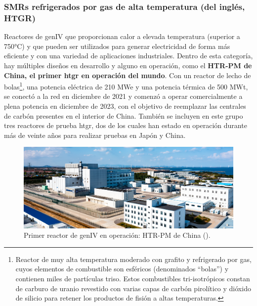 \subsubsection{SMRs refrigerados por gas de alta temperatura (del inglés, HTGR)}

Reactores de \acrshort{genIV} que proporcionan calor a elevada temperatura (superior a 750°C) y que pueden ser utilizados para generar electricidad de forma más eficiente y con una variedad de aplicaciones industriales. Dentro de esta categoría, hay múltiples diseños en desarrollo y alguno en operación, como el \textbf{HTR-PM de China, el primer \acrshort{htgr} en operación del mundo}. Con un \gls{reactor de lecho de bolas}\footnote{Reactor de muy alta temperatura moderado con grafito y refrigerado por gas, cuyos elementos de combustible son esféricos (denominados ``bolas'') y contienen miles de partículas \acrshort{triso}. Estos combustibles tri-isotrópicos constan de carburo de uranio revestido con varias capas de carbón pirolítico y dióxido de silicio para retener los productos de fisión a altas temperaturas.}, una potencia eléctrica de 210 MWe y una potencia térmica de 500 MWt, se conectó a la red en diciembre de 2021 y comenzó a operar comercialmente a plena potencia en diciembre de 2023, con el objetivo de reemplazar las centrales de carbón presentes en el interior de China. También se incluyen en este grupo tres reactores de prueba \acrshort{htgr}, dos de los cuales han estado en operación durante más de veinte años para realizar pruebas en Japón y China.

\begin{figure}[h]
  \centering
  \includegraphics[width=\textwidth]{content/figures/HTR_PM_china.png}
  \caption{Primer reactor de \acrshort{genIV} en operación: HTR-PM de China (\cite{htr_pm_china}).}
  \label{fig:htr_pm_china}
\end{figure}

